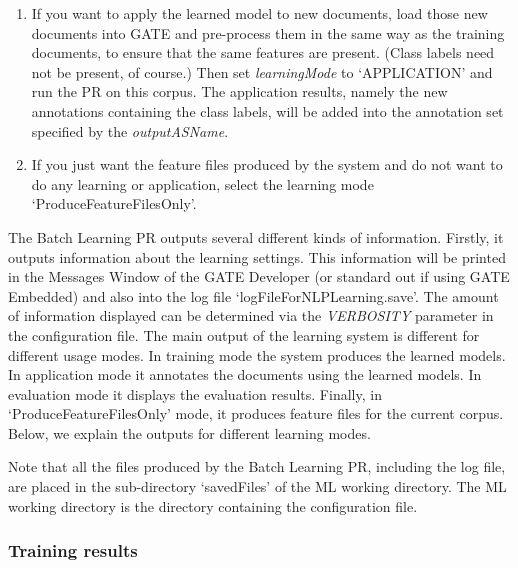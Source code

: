 \begin{enumerate}
\item If you want to apply the learned model to new documents, load those new
documents
 into GATE and pre-process them in the same way as the training documents, to
 ensure that the same features are present. (Class labels need not be present, of
 course.) Then set {\em learningMode} to `APPLICATION' and run the PR on this
 corpus. The application results, namely the new annotations containing the
 class labels, will be added into the annotation set specified by the {\em
 outputASName}.

\item If you just want the feature files produced by the system and do not want
to do any learning or application, select the learning mode
`ProduceFeatureFilesOnly'.

\end{enumerate}


The Batch Learning PR outputs several different kinds of information. Firstly, it
outputs information about the learning settings. This information will be printed
in the Messages Window of the GATE Developer (or standard out if using GATE
Embedded) and also into the log file `logFileForNLPLearning.save'.  The amount
of information displayed can be determined via the {\em VERBOSITY} parameter in
the configuration file. The main output of the learning system is different for
different usage modes. In training mode the system produces the learned models.
In application mode it annotates the documents using the learned models. In
evaluation mode it displays the evaluation results. Finally, in
`ProduceFeatureFilesOnly' mode, it produces feature files for the current
corpus. Below, we explain the outputs for different learning modes.

Note that all the files produced by the Batch Learning PR, including the log
file, are placed in the sub-directory `savedFiles' of the ML working directory.
The ML working directory is the directory containing the configuration file.

\subsubsection{Training results}

